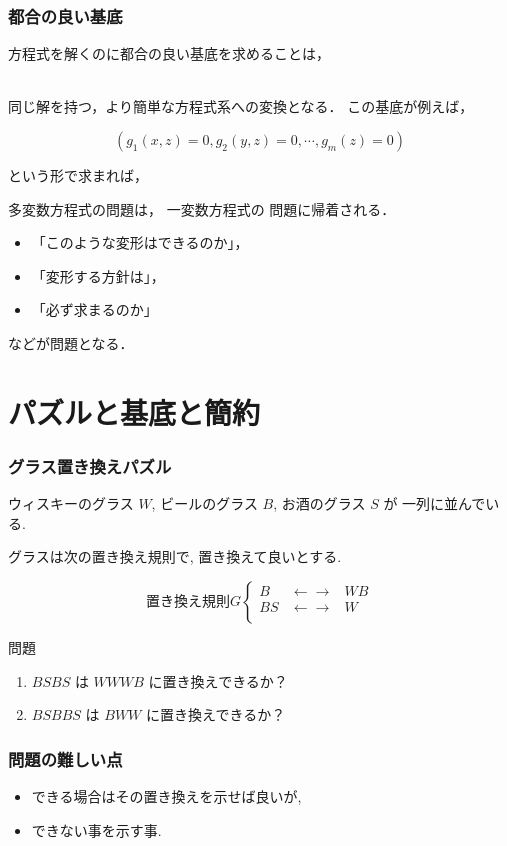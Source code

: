 \begin{frame}\frametitle{都合の良い基底}

方程式を解くのに都合の良い基底を求めることは，

\ \\

同じ解を持つ，より簡単な方程式系への変換となる．
この基底が例えば，

\[
(g_1(x, z) =0, g_2(y,z) = 0, \cdots, g_m(z) =0)
\]

という形で求まれば，

多変数方程式の問題は， 一変数方程式の
問題に帰着される．

\begin{itemize}
\item 「このような変形はできるのか」，
\item 「変形する方針は」，
\item 「必ず求まるのか」
\end{itemize}

などが問題となる．
\end{frame}

\section{パズルと基底と簡約}

\begin{frame}\frametitle{グラス置き換えパズル}

ウィスキーのグラス $W$, ビールのグラス $B$, お酒のグラス $S$ が
一列に並んでいる.

グラスは次の置き換え規則で, 置き換えて良いとする.

\[
\mbox{置き換え規則} G \left\{ 
 \begin{array}{rll}
B &  \leftarrow\rightarrow  &  W B\\
BS& \leftarrow\rightarrow   & W  \\
 \end{array}
\right.
\]

\begin{block}{問題}
\begin{enumerate}
\item $BSBS$ は $WWWB$ に置き換えできるか？
\item $BSBBS$ は $BWW$ に置き換えできるか？
\end{enumerate}
\end{block}
\end{frame}

\begin{frame}\frametitle{問題の難しい点}
\begin{itemize}
\item できる場合はその置き換えを示せば良いが,
\item できない事を示す事.
\end{itemize}
\end{frame}

